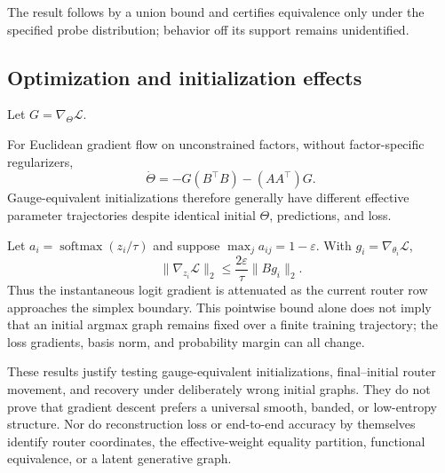 The result follows by a union bound and certifies equivalence only under the
specified probe distribution; behavior off its support remains unidentified.

\subsection{Optimization and initialization effects}

Let $G=\nabla_\Theta\mathcal L$.

\begin{proposition}
\label{prop:factor_dynamics}
For Euclidean gradient flow on unconstrained factors, without factor-specific
regularizers,
\begin{equation}
 \dot\Theta=-G(B^\top B)-(AA^\top)G.
 \label{eq:effective_gradient_flow}
\end{equation}
Gauge-equivalent initializations therefore generally have different effective
parameter trajectories despite identical initial $\Theta$, predictions, and
loss.
\end{proposition}

\begin{proposition}
\label{prop:softmax_saturation}
Let $a_i=\operatorname{softmax}(z_i/\tau)$ and suppose
$\max_j a_{ij}=1-\varepsilon$.  With
$g_i=\nabla_{\theta_i}\mathcal L$,
\begin{equation}
 \|\nabla_{z_i}\mathcal L\|_2
 \le \frac{2\varepsilon}{\tau}\|Bg_i\|_2.
 \label{eq:saturation_bound}
\end{equation}
Thus the instantaneous logit gradient is attenuated as the current router row
approaches the simplex boundary.  This pointwise bound alone does not imply
that an initial argmax graph remains fixed over a finite training trajectory;
the loss gradients, basis norm, and probability margin can all change.
\end{proposition}

These results justify testing gauge-equivalent initializations, final--initial
router movement, and recovery under deliberately wrong initial graphs.  They
do not prove that gradient descent prefers a universal smooth, banded, or
low-entropy structure.  Nor do reconstruction loss or end-to-end accuracy by
themselves identify router coordinates, the effective-weight equality
partition, functional equivalence, or a latent generative graph.
